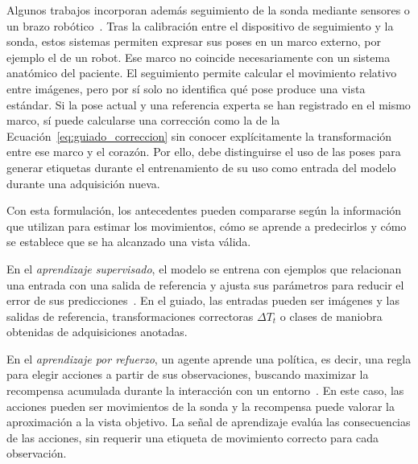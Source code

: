 \documentclass[10pt,a4paper]{article}
\begin{document}
Algunos trabajos incorporan además seguimiento de la sonda mediante sensores o un brazo robótico~\cite{Jiang2024,Yue2025,Wang2026}. Tras la calibración entre el dispositivo de seguimiento y la sonda, estos sistemas permiten expresar sus poses en un marco externo, por ejemplo el de un robot. Ese marco no coincide necesariamente con un sistema anatómico del paciente. El seguimiento permite calcular el movimiento relativo entre imágenes, pero por sí solo no identifica qué pose produce una vista estándar. Si la pose actual y una referencia experta se han registrado en el mismo marco, sí puede calcularse una corrección como la de la Ecuación~\eqref{eq:guiado_correccion} sin conocer explícitamente la transformación entre ese marco y el corazón. Por ello, debe distinguirse el uso de las poses para generar etiquetas durante el entrenamiento de su uso como entrada del modelo durante una adquisición nueva.

Con esta formulación, los antecedentes pueden compararse según la información que utilizan para estimar los movimientos, cómo se aprende a predecirlos y cómo se establece que se ha alcanzado una vista válida.

En el \textit{aprendizaje supervisado}, el modelo se entrena con ejemplos que relacionan una entrada con una salida de referencia y ajusta sus parámetros para reducir el error de sus predicciones~\cite{BishopBishop2024}. En el guiado, las entradas pueden ser imágenes y las salidas de referencia, transformaciones correctoras $\Delta T_t$ o clases de maniobra obtenidas de adquisiciones anotadas.

En el \textit{aprendizaje por refuerzo}, un agente aprende una política, es decir, una regla para elegir acciones a partir de sus observaciones, buscando maximizar la recompensa acumulada durante la interacción con un entorno~\cite{SuttonBarto2018}. En este caso, las acciones pueden ser movimientos de la sonda y la recompensa puede valorar la aproximación a la vista objetivo. La señal de aprendizaje evalúa las consecuencias de las acciones, sin requerir una etiqueta de movimiento correcto para cada observación.
\end{document}
